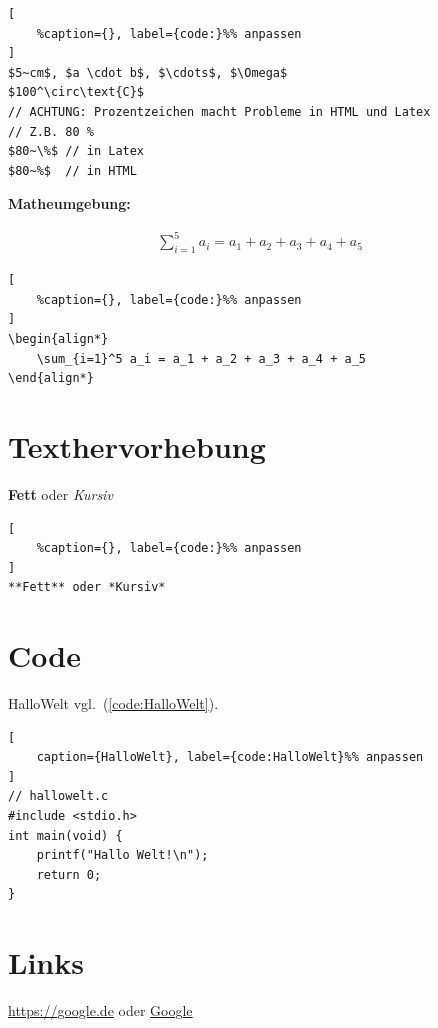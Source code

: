 \lstset{language=C}%
\begin{lstlisting}[
	%caption={}, label={code:}%% anpassen
]
$5~cm$, $a \cdot b$, $\cdots$, $\Omega$
$100^\circ\text{C}$  
// ACHTUNG: Prozentzeichen macht Probleme in HTML und Latex 
// Z.B. 80 %
$80~\%$ // in Latex
$80~%$  // in HTML
\end{lstlisting}

\textbf{Matheumgebung:}

\begin{align*}
    \sum_{i=1}^5 a_i = a_1 + a_2 + a_3 + a_4 + a_5
\end{align*}

\lstset{language=C}%
\begin{lstlisting}[
	%caption={}, label={code:}%% anpassen
]
\begin{align*}
    \sum_{i=1}^5 a_i = a_1 + a_2 + a_3 + a_4 + a_5
\end{align*}
\end{lstlisting}

\section{Texthervorhebung}\label{texthervorhebung}

\textbf{Fett} oder \emph{Kursiv}

\lstset{language=C}%
\begin{lstlisting}[
	%caption={}, label={code:}%% anpassen
]
**Fett** oder *Kursiv*
\end{lstlisting}

\section{Code}\label{code}

HalloWelt vgl.~(\autoref{code:HalloWelt}).

\lstset{language=C}%
\begin{lstlisting}[
	caption={HalloWelt}, label={code:HalloWelt}%% anpassen
]
// hallowelt.c
#include <stdio.h>
int main(void) {
    printf("Hallo Welt!\n");
    return 0;
}
\end{lstlisting}

\section{Links}\label{links}

\url{https://google.de} oder \href{https://google.de}{Google}

